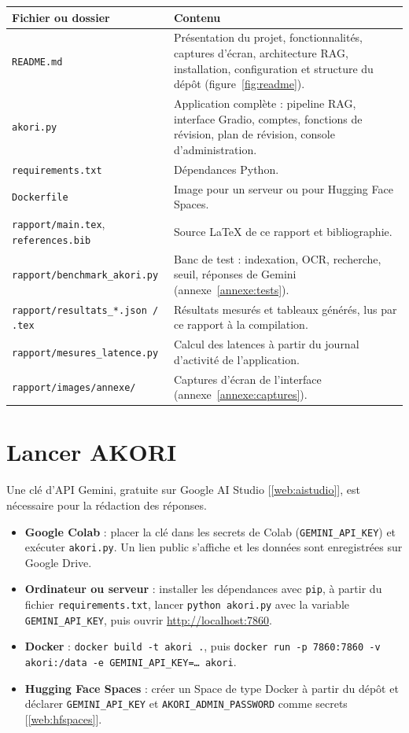 \documentclass[12pt,a4paper,oneside]{report}
\newcommand{\webref}[1]{[\ref{web:#1}]}
\begin{document}
\begin{longtable}{@{}p{}p{}@{}}
\toprule
\textbf{Fichier ou dossier} & \textbf{Contenu} \\ \midrule \endhead
\texttt{README.md} & Présentation du projet, fonctionnalités, captures d'écran, architecture RAG, installation, configuration et structure du dépôt (figure~\ref{fig:readme}). \\
\texttt{akori.py} & Application complète : pipeline RAG, interface Gradio, comptes, fonctions de révision, plan de révision, console d'administration. \\
\texttt{requirements.txt} & Dépendances Python. \\
\texttt{Dockerfile} & Image pour un serveur ou pour Hugging Face Spaces. \\
\texttt{rapport/main.tex}, \texttt{references.bib} & Source LaTeX de ce rapport et bibliographie. \\
\texttt{rapport/benchmark\_akori.py} & Banc de test : indexation, OCR, recherche, seuil, réponses de Gemini (annexe~\ref{annexe:tests}). \\
\texttt{rapport/resultats\_*.json / .tex} & Résultats mesurés et tableaux générés, lus par ce rapport à la compilation. \\
\texttt{rapport/mesures\_latence.py} & Calcul des latences à partir du journal d'activité de l'application. \\
\texttt{rapport/images/annexe/} & Captures d'écran de l'interface (annexe~\ref{annexe:captures}). \\
\bottomrule
\end{longtable}

\section{Lancer AKORI}

Une clé d'API Gemini, gratuite sur Google AI Studio \webref{aistudio}, est nécessaire pour la rédaction des réponses.

\begin{itemize}
  \item \textbf{Google Colab} : placer la clé dans les secrets de Colab (\texttt{GEMINI\_API\_KEY}) et exécuter \texttt{akori.py}. Un lien public s'affiche et les données sont enregistrées sur Google Drive.
  \item \textbf{Ordinateur ou serveur} : installer les dépendances avec \texttt{pip}, à partir du fichier \texttt{requirements.txt}, lancer \texttt{python akori.py} avec la variable \texttt{GEMINI\_API\_KEY}, puis ouvrir \url{http://localhost:7860}.
  \item \textbf{Docker} : \texttt{docker build -t akori .}, puis \texttt{docker run -p 7860:7860 -v akori:/data -e GEMINI\_API\_KEY=\dots{} akori}.
  \item \textbf{Hugging Face Spaces} : créer un Space de type Docker à partir du dépôt et déclarer \texttt{GEMINI\_API\_KEY} et \texttt{AKORI\_ADMIN\_PASSWORD} comme secrets \webref{hfspaces}.
\end{itemize}
\end{document}
